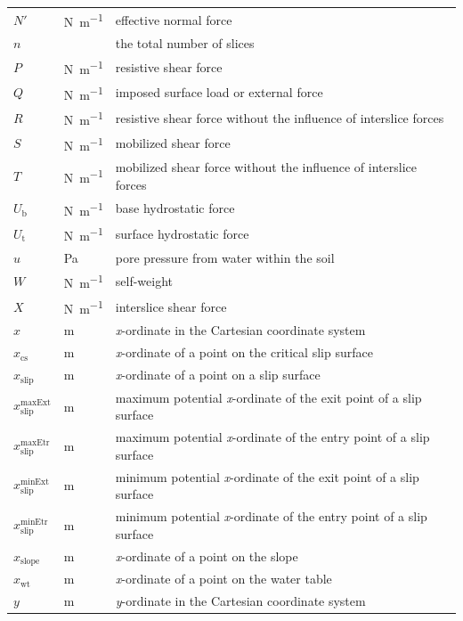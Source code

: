 \documentclass[12pt]{article}
\begin{document}
\begin{longtable*}{  l  l  p{8.5cm}  }
$N'$ &\si{\newton\per\meter} & effective normal force
\\
$n$ & & the total number of slices
\\
$P$ & \si{\newton\per\meter} & resistive shear force
\\
$Q$ & \si{\newton\per\meter} & imposed surface load or external force
\\
$R$ & \si{\newton\per\meter} & resistive shear force without the influence of 
interslice forces
\\
$S$ & \si{\newton\per\meter} & mobilized shear force
\\
$T$ & \si{\newton\per\meter} & mobilized shear force without the influence of 
interslice 
forces
\\
${U_{\text{b}}}$ & \si{\newton\per\meter} & base hydrostatic force
\\
${U_{\text{t}}}$ & \si{\newton\per\meter} & surface hydrostatic force
\\
$u$ &\si{\pascal} & pore pressure from water within the soil
\\
$W$ & \si{\newton\per\meter} & self-weight
\\
$X$ & \si{\newton\per\meter} & interslice shear force
\\
$x$ & \si{\meter}& \textit{x}-ordinate in the Cartesian coordinate system
\\
$x_{\text{cs}}$ & \si{\meter} & \textit{x}-ordinate of a point on the critical 
slip 
surface
\\
${x_{\text{slip}}}$ &  \si{\meter}& \textit{x}-ordinate of a point on a slip 
surface
\\
${x_{\text{slip}}^{\text{maxExt}}}$ &  \si{\meter}& maximum potential 
\textit{x}-ordinate of 
the exit point of a slip surface
\\
${x_{\text{slip}}^{\text{maxEtr}}}$ &  \si{\meter}& maximum potential 
\textit{x}-ordinate 
of the entry point of a slip surface
\\
${x_{\text{slip}}^{\text{minExt}}}$ &  \si{\meter}& minimum potential 
\textit{x}-ordinate of 
the exit point of a slip surface
\\
${x_{\text{slip}}^{\text{minEtr}}}$ &  \si{\meter}& minimum potential 
\textit{x}-ordinate 
of the entry point of a slip surface
\\
${x_{\text{slope}}}$ &  \si{\meter}& \textit{x}-ordinate of a point on the slope
\\
${x_{\text{wt}}}$ & \si{\meter} & \textit{x}-ordinate of a point on the water 
table
\\
$y$ &  \si{\meter}& \textit{y}-ordinate in the Cartesian coordinate system

\end{longtable*}
\end{document}
